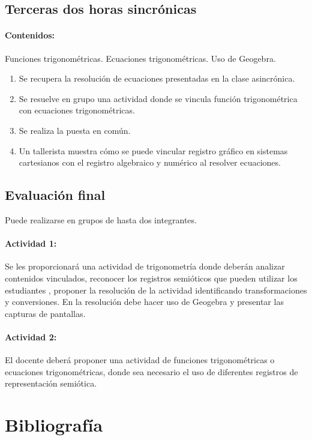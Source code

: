 \documentclass[oneside,spanish]{amsart}
\numberwithin{equation}{section}
\numberwithin{figure}{section}
\begin{document}
\subsection{Terceras dos horas sincrónicas}\label{terceras-dos}

\paragraph{Contenidos:}

Funciones trigonométricas. Ecuaciones trigonométricas. Uso de Geogebra.

\begin{enumerate}[1.]
	\item Se recupera la resolución de ecuaciones presentadas en la clase asincrónica.
	\item Se resuelve en grupo una actividad donde se vincula función trigonométrica con ecuaciones trigonométricas. 
	\item Se realiza la puesta en común.
	\item Un tallerista muestra cómo  se puede vincular registro gráfico en sistemas cartesianos con el registro algebraico y numérico al resolver ecuaciones. 
\end{enumerate} 

\subsection{Evaluación final}

Puede realizarse en grupos de hasta dos integrantes.

\paragraph{Actividad 1:}

Se les proporcionará una actividad de trigonometría donde deberán analizar contenidos vinculados, reconocer los registros semióticos que pueden utilizar los estudiantes , proponer la resolución de la actividad identificando transformaciones y conversiones. En la resolución debe hacer uso de Geogebra y presentar las capturas de pantallas.

\bigskip

\paragraph{Actividad 2:}

El docente deberá proponer una actividad de funciones trigonométricas o ecuaciones trigonométricas, donde sea necesario el uso de diferentes registros de representación semiótica.

\section{Bibliografía}

\printbibliography
\end{document}
